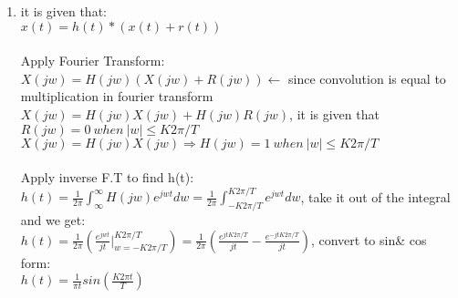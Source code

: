 \documentclass[10pt,a4paper, margin=1in]{article}
\begin{document}
\begin{enumerate}
\item 
it is given that:\\
$x(t)=h(t) * (x(t)+r(t))$\\
\\
Apply Fourier Transform:\\
$X(jw)=H(jw)(X(jw)+R(jw)) \longleftarrow$ since convolution is equal to multiplication in fourier transform \\
$X(jw)=H(jw)X(jw)+H(jw)R(jw)$, it is given that $R(jw)=0\ when\ |w| \leq K2\pi/T$\\
$X(jw)=H(jw)X(jw) \Longrightarrow H(jw)=1 \ when\ |w| \leq K2\pi/T$\\
\\
Apply inverse F.T to find h(t):\\
$h(t)=\frac{1}{2\pi}\int_\infty^\infty H(jw)e^{jwt}dw = \frac{1}{2\pi}\int_{-K2\pi/T}^{K2\pi/T} e^{jwt}dw$, take it out of the integral and we get:\\
$h(t)=\frac{1}{2\pi}(\frac{e^{jwt}}{jt}|_{w=-K2\pi/T}^{K2\pi/T})=\frac{1}{2\pi}(\frac{e^{jtK2\pi/T}}{jt}-\frac{e^{-jtK2\pi/T}}{jt})$, convert to sin\& cos form:\\
$h(t)=\frac{1}{\pi t}sin(\frac{K2\pi t}{T})$


\end{enumerate}
\end{document}
